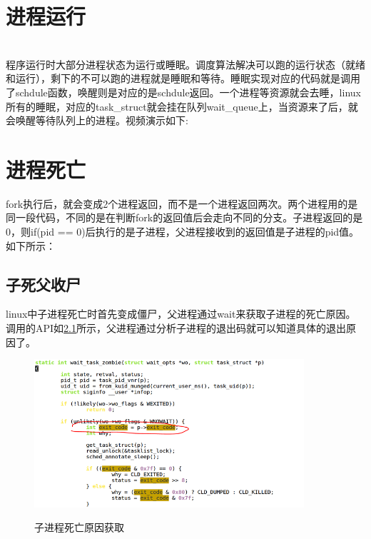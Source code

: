 \chapter{进程运行}
~\\程序运行时大部分进程状态为运行或睡眠。调度算法解决可以跑的运行状态（就绪和运行），剩下的不可以跑的进程就是睡眠和等待。睡眠实现对应的代码就是调用了schdule函数，唤醒则是对应的是schdule返回。一个进程等资源就会去睡，linux所有的睡眠，对应的task\_struct就会挂在队列wait\_queue上，当资源来了后，就会唤醒等待队列上的进程。视频演示如下:
\begin{tcolorbox}[colback=blue!5,colframe=blue!75!black,title=等待队列视频]
\end{tcolorbox}


\chapter{进程死亡}
fork执行后，就会变成2个进程返回，而不是一个进程返回两次。两个进程用的是同一段代码，不同的是在判断fork的返回值后会走向不同的分支。子进程返回的是0，则if(pid == 0)后执行的是子进程，父进程接收到的返回值是子进程的pid值。如下所示：


\section{子死父收尸}
linux中子进程死亡时首先变成僵尸，父进程通过wait来获取子进程的死亡原因。调用的API如\ref{child_wait}所示，父进程通过分析子进程的退出码就可以知道具体的退出原因了。

\begin{figure}[H]
 \wdfigbox
  {\caption{子进程死亡原因获取}\label{child_wait}}
  {
  \includegraphics[width=10cm]{./figure/child_wait.png}
  }
\end{figure}

